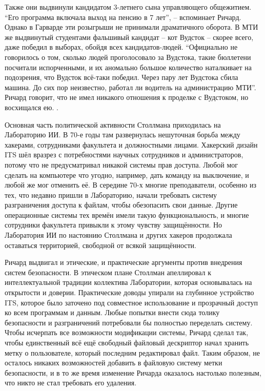 Также они выдвинули кандидатом 3-летнего сына управляющего общежитием. \enquote{Его программа включала выход на пенсию в 7 лет}, -- вспоминает Ричард. Однако в Гарварде эти розыгрыши не принимали драматичного оборота. В МТИ же выдвинутый студентами фальшивый кандидат -- кот Вудсток -- скорее всего, даже победил в выборах, обойдя всех кандидатов-людей. \enquote{Официально не говорилось о том, сколько людей проголосовало за Вудстока, такие бюллетени посчитали испорченными, и их аномально большое количество наталкивает на подозрения, что Вудсток всё-таки победил. Через пару лет Вудстока сбила машина. До сих пор неизвестно, работал ли водитель на администрацию МТИ}. Ричард говорит, что не имел никакого отношения к проделке с Вудстоком, но восхищался ею. .

Основная часть политической активности Столлмана приходилась на Лабораторию ИИ. В 70-е годы там развернулась нешуточная борьба между хакерами, сотрудниками факультета и должностными лицами. Хакерский дизайн ITS шёл вразрез с потребностями научных сотрудников и администраторов, потому что не предусматривал никакой системы прав доступа. Любой мог сделать на компьютере что угодно, например, дать команду на выключение, и любой же мог отменить её. В середине 70-х многие преподаватели, особенно из тех, что недавно пришли в Лабораторию, начали требовать систему разграничения доступа к файлам, чтобы обезопасить свои данные. Другие операционные системы тех времён имели такую функциональность, и многие сотрудники факультета привыкли к этому чувству защищённости. Но Лаборатория ИИ по настоянию Столлмана и других хакеров продолжала оставаться территорией, свободной от всякой защищённости.

Ричард выдвигал и этические, и практические аргументы против внедрения систем безопасности. В этическом плане Столлман апеллировал к интеллектуальной традиции коллектива Лаборатории, которая основывалась на открытости и доверии. Практические доводы упирали на глубинное устройство ITS, которое было заточено под совместное использование и прозрачный доступ ко всем программам и данным. Любые попытки внести сюда толику безопасности и разграничений потребовали бы полностью переделать систему. Чтобы исчерпать все возможности модификации системы, Ричард сделал так, чтобы единственный всё ещё свободный файловый дескриптор начал хранить метку о пользователе, который последним редактировал файл. Таким образом, не осталось никаких возможностей добавить в файловую систему метки безопасности, и в то же время изменение Ричарда оказалось настолько полезным, что никто не стал требовать его удаления.

